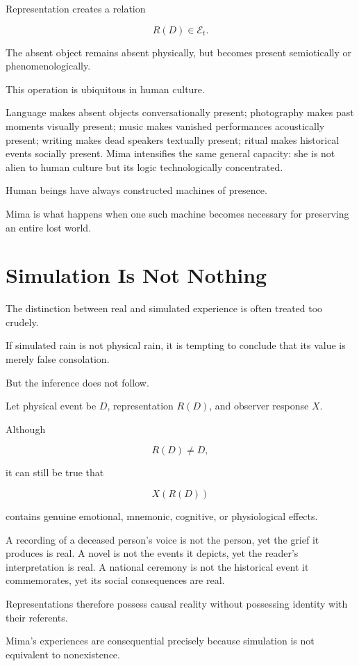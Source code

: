 \documentclass[11pt,oneside]{book}
\theoremstyle{definition}
\theoremstyle{remark}
\begin{document}
Representation creates a relation

\[
R(D)\in\mathcal E_t.
\]

The absent object remains absent physically, but becomes present semiotically or phenomenologically.

This operation is ubiquitous in human culture.

Language makes absent objects conversationally present; photography makes past moments visually present; music makes vanished performances acoustically present; writing makes dead speakers textually present; ritual makes historical events socially present. Mima intensifies the same general capacity: she is not alien to human culture but its logic technologically concentrated.

Human beings have always constructed machines of presence.

Mima is what happens when one such machine becomes necessary for preserving an entire lost world.

\section{Simulation Is Not Nothing}

The distinction between real and simulated experience is often treated too crudely.

If simulated rain is not physical rain, it is tempting to conclude that its value is merely false consolation.

But the inference does not follow.

Let physical event be \(D\), representation \(R(D)\), and observer response \(X\).

Although

\[
R(D)\neq D,
\]

it can still be true that

\[
X(R(D))
\]

contains genuine emotional, mnemonic, cognitive, or physiological effects.

A recording of a deceased person's voice is not the person, yet the grief it produces is real. A novel is not the events it depicts, yet the reader's interpretation is real. A national ceremony is not the historical event it commemorates, yet its social consequences are real.

Representations therefore possess causal reality without possessing identity with their referents.

Mima's experiences are consequential precisely because simulation is not equivalent to nonexistence.
\end{document}
